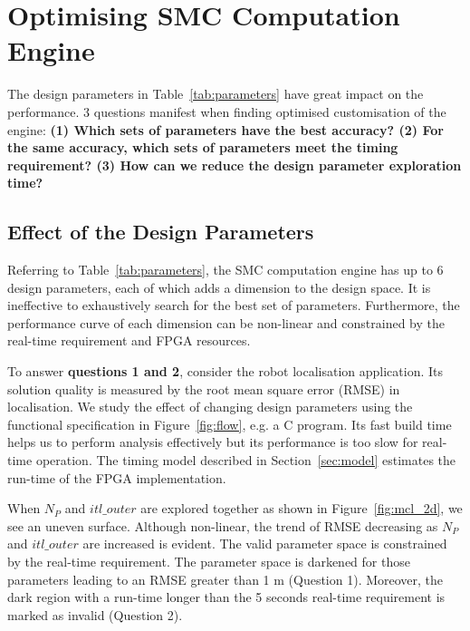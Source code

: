 

\section{Optimising SMC Computation Engine}
\label{sec:optimisation}

The design parameters in Table~\ref{tab:parameters} have great impact on the performance.
3 questions manifest when finding optimised customisation of the engine:
\textbf{(1) Which sets of parameters have the best accuracy?
(2) For the same accuracy, which sets of parameters meet the timing requirement?
(3) How can we reduce the design parameter exploration time?}

\subsection{Effect of the Design Parameters}
\label{sec:parameters}

Referring to Table~\ref{tab:parameters}, the SMC computation engine has up to 6 design parameters, each of which adds a dimension to the design space.
It is ineffective to exhaustively search for the best set of parameters.
Furthermore, the performance curve of each dimension can be non-linear and constrained by the real-time requirement and FPGA resources.

To answer \textbf{questions 1 and 2}, consider the robot localisation application.
Its solution quality is measured by the root mean square error (RMSE) in localisation.
We study the effect of changing design parameters using the functional specification in Figure~\ref{fig:flow}, e.g. a C program.
Its fast build time helps us to perform analysis effectively but its performance is too slow for real-time operation.
The timing model described in Section~\ref{sec:model} estimates the run-time of the FPGA implementation.

When $N_P$ and $itl\_outer$ are explored together as shown in Figure~\ref{fig:mcl_2d}, we see an uneven surface.
Although non-linear, the trend of  RMSE decreasing as $N_P$ and $itl\_outer$ are increased is evident.
The valid parameter space is constrained by the real-time requirement.
The parameter space is darkened for those parameters leading to an RMSE greater than 1 m (Question 1).
Moreover, the dark region with a run-time longer than the 5 seconds real-time requirement is marked as invalid (Question 2).

